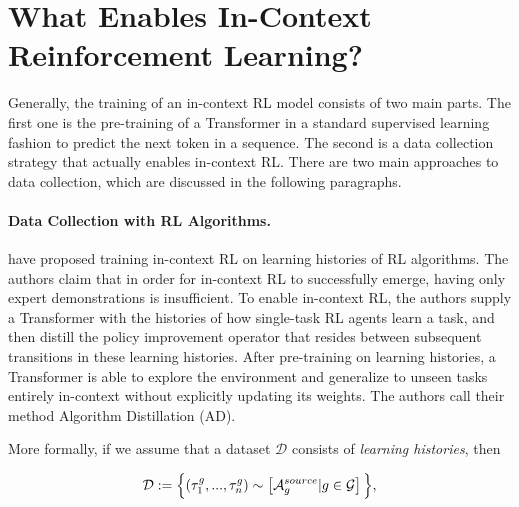 \documentclass{article}
\theoremstyle{plain}
\theoremstyle{definition}
\theoremstyle{remark}
\begin{document}
\section{What Enables In-Context Reinforcement Learning?}
\label{sec:backgrnd}
Generally, the training of an in-context RL model consists of two main parts. The first one is the pre-training of a Transformer in a standard supervised learning fashion to predict the next token in a sequence. The second is a data collection strategy that actually enables in-context RL. There are two main approaches to data collection, which are discussed in the following paragraphs.




\paragraph{Data Collection with RL Algorithms.}
\citet{laskin2022context} have proposed training in-context RL on learning histories of RL algorithms. The authors claim that in order for in-context RL to successfully emerge, having only expert demonstrations is insufficient. To enable in-context RL, the authors supply a Transformer with the histories of how single-task RL agents learn a task, and then distill the policy improvement operator that resides between subsequent transitions in these learning histories. After pre-training on learning histories, a Transformer is able to explore the environment and generalize to unseen tasks entirely in-context without explicitly updating its weights. The authors call their method Algorithm Distillation (AD).

More formally, if we assume that a dataset $\mathcal{D}$ consists of \textit{learning histories}, then

$$
\mathcal{D}: = \Bigl\{ \left( \tau_1^g, ..., \tau_n^g \right) \sim \left[ \mathcal{A}^{source}_g | g \in \mathcal{G} \right] \Bigl\},
$$
\end{document}
